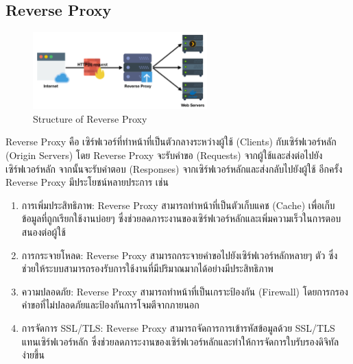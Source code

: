     \subsection{Reverse Proxy}
    \begin{figure}[!h]
      \centering
      \includegraphics[width=0.6\textwidth]{image/Background/Reverse-proxy.png}
      \caption[Reverse Proxy]{Structure of Reverse Proxy}
      \label{fig:reverse_proxy_pic}
    \end{figure}
    \qquad Reverse Proxy คือ เซิร์ฟเวอร์ที่ทำหน้าที่เป็นตัวกลางระหว่างผู้ใช้ (Clients) กับเซิร์ฟเวอร์หลัก (Origin Servers)
    โดย Reverse Proxy จะรับคำขอ (Requests) จากผู้ใช้และส่งต่อไปยังเซิร์ฟเวอร์หลัก จากนั้นจะรับคำตอบ (Responses)
    จากเซิร์ฟเวอร์หลักและส่งกลับไปยังผู้ใช้ อีกครั้ง Reverse Proxy มีประโยชน์หลายประการ เช่น \cite{ReverseProxy}
    \begin{enumerate}
      \item การเพิ่มประสิทธิภาพ: Reverse Proxy สามารถทำหน้าที่เป็นตัวเก็บแคช (Cache) เพื่อเก็บข้อมูลที่ถูกเรียกใช้งานบ่อยๆ
      ซึ่งช่วยลดภาระงานของเซิร์ฟเวอร์หลักและเพิ่มความเร็วในการตอบสนองต่อผู้ใช้
      \item การกระจายโหลด: Reverse Proxy สามารถกระจายคำขอไปยังเซิร์ฟเวอร์หลักหลายๆ ตัว
      ซึ่งช่วยให้ระบบสามารถรองรับการใช้งานที่มีปริมาณมากได้อย่างมีประสิทธิภาพ
      \item ความปลอดภัย: Reverse Proxy สามารถทำหน้าที่เป็นเกราะป้องกัน (Firewall)
      โดยการกรองคำขอที่ไม่ปลอดภัยและป้องกันการโจมตีจากภายนอก
      \item การจัดการ SSL/TLS: Reverse Proxy สามารถจัดการการเข้ารหัสข้อมูลด้วย SSL/TLS
      แทนเซิร์ฟเวอร์หลัก ซึ่งช่วยลดภาระงานของเซิร์ฟเวอร์หลักและทำให้การจัดการใบรับรองดิจิทัลง่ายขึ้น
    \end{enumerate}
    
